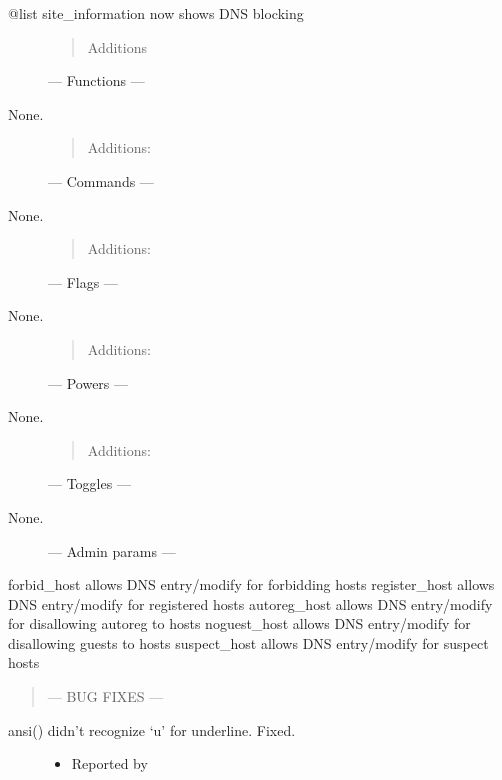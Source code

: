 \documentclass[letterpaper,10pt,english]{sphinxmanual}
\begin{document}
\begin{description}
\item[{@list site\_information now shows DNS blocking}] \leavevmode\begin{quote}

\sphinxAtStartPar
Additions
\end{quote}

\sphinxAtStartPar
— Functions —

\item[{None.}] \leavevmode\begin{quote}

\sphinxAtStartPar
Additions:
\end{quote}

\sphinxAtStartPar
— Commands —

\item[{None.}] \leavevmode\begin{quote}

\sphinxAtStartPar
Additions:
\end{quote}

\sphinxAtStartPar
— Flags —

\item[{None.}] \leavevmode\begin{quote}

\sphinxAtStartPar
Additions:
\end{quote}

\sphinxAtStartPar
— Powers —

\item[{None.}] \leavevmode\begin{quote}

\sphinxAtStartPar
Additions:
\end{quote}

\sphinxAtStartPar
— Toggles —

\item[{None.}] \leavevmode
\sphinxAtStartPar
— Admin params —

\end{description}

\sphinxAtStartPar
forbid\_host \sphinxhyphen{} allows DNS entry/modify for forbidding hosts
register\_host \sphinxhyphen{} allows DNS entry/modify for registered hosts
autoreg\_host \sphinxhyphen{} allows DNS entry/modify for disallowing autoreg to hosts
noguest\_host \sphinxhyphen{} allows DNS entry/modify for disallowing guests to hosts
suspect\_host \sphinxhyphen{} allows DNS entry/modify for suspect hosts
\begin{quote}

\sphinxAtStartPar
— BUG FIXES —
\end{quote}
\begin{description}
\item[{ansi() didn’t recognize ‘u’ for underline.  Fixed.}] \leavevmode\begin{itemize}
\item {} 
\sphinxAtStartPar
Reported by 

\end{itemize}

\end{description}
\end{document}
